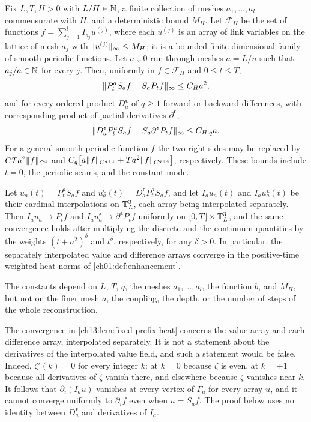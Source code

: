 \begin{lemma}\label{ch13:lem:fixed-prefix-heat}
Fix $L,T,H>0$ with $L/H\in\mathbb N$, a finite collection of meshes $a_1,\dots,a_l$ commensurate with $H$, and a deterministic bound $M_H$. Let $\mathscr F_H$ be the set of functions $f=\sum_{j=1}^lI_{a_j}u^{(j)}$, where each $u^{(j)}$ is an array of link variables on the lattice of mesh $a_j$ with $\lVert u^{(j)}\rVert_\infty\le M_H$; it is a bounded finite-dimensional family of smooth periodic functions. Let $a\downarrow0$ run through meshes $a=L/n$ such that $a_j/a\in\mathbb N$ for every $j$. Then, uniformly in $f\in\mathscr F_H$ and $0\le t\le T$,
\[
 \lVert P_t^aS_af-S_aP_tf\rVert_\infty\le C_Ha^2,
\]
and for every ordered product $D_a^{\boldsymbol\epsilon}$ of $q\ge1$ forward or backward differences, with corresponding product of partial derivatives $\partial^{\boldsymbol\epsilon}$,
\[
 \lVert D_a^{\boldsymbol\epsilon}P_t^aS_af-S_a\partial^{\boldsymbol\epsilon}P_tf\rVert_\infty\le C_{H,q}a.
\]
For a general smooth periodic function $f$ the two right sides may be replaced by $CTa^2\lVert f\rVert_{C^4}$ and $C_q\bigl[a\lVert f\rVert_{C^{q+1}}+Ta^2\lVert f\rVert_{C^{q+4}}\bigr]$, respectively. These bounds include $t=0$, the periodic seams, and the constant mode.

Let $u_a(t)=P_t^aS_af$ and $u_a^{\boldsymbol\epsilon}(t)=D_a^{\boldsymbol\epsilon}P_t^aS_af$, and let $I_au_a(t)$ and $I_au_a^{\boldsymbol\epsilon}(t)$ be their cardinal interpolations on $\mathbb T_L^3$, each array being interpolated separately. Then $I_au_a\to P_tf$ and $I_au_a^{\boldsymbol\epsilon}\to\partial^{\boldsymbol\epsilon}P_tf$ uniformly on $[0,T]\times\mathbb T_L^3$, and the same convergence holds after multiplying the discrete and the continuum quantities by the weights $(t+a^2)^\delta$ and $t^\delta$, respectively, for any $\delta>0$. In particular, the separately interpolated value and difference arrays converge in the positive-time weighted heat norms of \cref{ch01:def:enhancement}.

The constants depend on $L$, $T$, $q$, the meshes $a_1,\dots,a_l$, the function $b$, and $M_H$, but not on the finer mesh $a$, the coupling, the depth, or the number of steps of the whole reconstruction.
\end{lemma}

\begin{remark}\label{ch13:rem:interpolant-derivative}
The convergence in \cref{ch13:lem:fixed-prefix-heat} concerns the value array and each difference array, interpolated separately. It is not a statement about the derivatives of the interpolated value field, and such a statement would be false. Indeed, $\zeta'(k)=0$ for every integer $k$: at $k=0$ because $\zeta$ is even, at $k=\pm1$ because all derivatives of $\zeta$ vanish there, and elsewhere because $\zeta$ vanishes near $k$. It follows that $\partial_i(I_au)$ vanishes at every vertex of $\Gamma_a$ for every array $u$, and it cannot converge uniformly to $\partial_if$ even when $u=S_af$. The proof below uses no identity between $D_a^{\boldsymbol\epsilon}$ and derivatives of $I_a$.
\end{remark}

